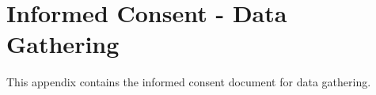 %
%
%                 

\chapter{Informed Consent - Data Gathering}
\label{sec:appendixh}

This appendix contains the informed consent document for data gathering. 



